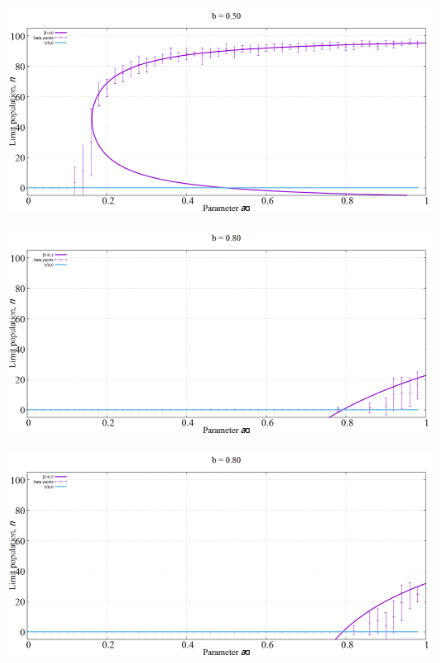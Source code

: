 \begin{figure}[h!]
 \centering
  \includegraphics[width=\linewidth]{images/appendix/simexpt/10.png}
\end{figure}

\begin{figure}[h!]
 \centering
  \includegraphics[width=\linewidth]{images/appendix/simexpt/11.png}
\end{figure}

\begin{figure}[h!]
 \centering
  \includegraphics[width=\linewidth]{images/appendix/simexpt/12.png}
\end{figure}

